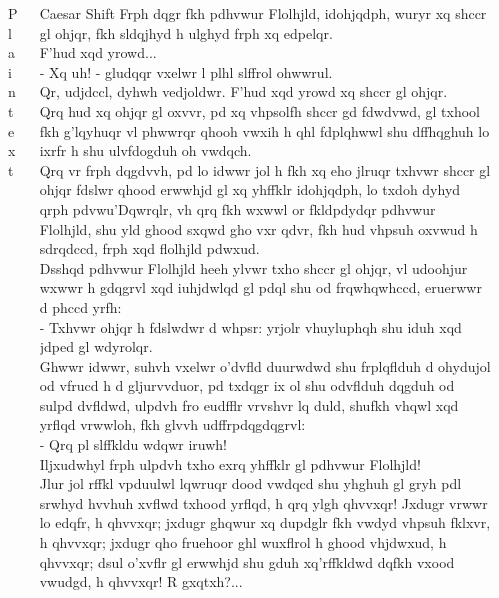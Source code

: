 \documentclass[final,hyperref={pdfpagelabels=false}]{beamer}
\begin{document}
\begin{frame}{}
\begin{columns}[t]
\begin{column}{.2\linewidth}
\begin{block}{Plaintext}
      \end{block}
    \end{column}
    \begin{column}{.2\linewidth}
        \begin{block}{Caesar Shift}
Frph dqgr fkh pdhvwur Flolhjld, idohjqdph, wuryr xq shccr gl ohjqr, fkh sldqjhyd h ulghyd frph xq edpelqr.\\
F'hud xqd yrowd...\\
- Xq uh! - gludqqr vxelwr l plhl slffrol ohwwrul.\\
Qr, udjdccl, dyhwh vedjoldwr. F'hud xqd yrowd xq shccr gl ohjqr.\\
Qrq hud xq ohjqr gl oxvvr, pd xq vhpsolfh shccr gd fdwdvwd, gl txhool fkh g'lqyhuqr vl phwwrqr qhooh vwxih h qhl fdplqhwwl shu dffhqghuh lo ixrfr h shu ulvfdogduh oh vwdqch.\\
Qrq vr frph dqgdvvh, pd lo idwwr jol h fkh xq eho jlruqr txhvwr shccr gl ohjqr fdslwr qhood erwwhjd gl xq yhffklr idohjqdph, lo txdoh dyhyd qrph pdvwu'Dqwrqlr, vh qrq fkh wxwwl or fkldpdydqr pdhvwur Flolhjld, shu yld ghood sxqwd gho vxr qdvr, fkh hud vhpsuh oxvwud h sdrqdccd, frph xqd flolhjld pdwxud.\\
Dsshqd pdhvwur Flolhjld heeh ylvwr txho shccr gl ohjqr, vl udoohjur wxwwr h gdqgrvl xqd iuhjdwlqd gl pdql shu od frqwhqwhccd, eruerwwr d phccd yrfh:\\
- Txhvwr ohjqr h fdslwdwr d whpsr: yrjolr vhuyluphqh shu iduh xqd jdped gl wdyrolqr.\\
Ghwwr idwwr, suhvh vxelwr o'dvfld duurwdwd shu frplqflduh d ohydujol od vfrucd h d gljurvvduor, pd txdqgr ix ol shu odvflduh dqgduh od sulpd dvfldwd, ulpdvh fro eudfflr vrvshvr lq duld, shufkh vhqwl xqd yrflqd vrwwloh, fkh glvvh udffrpdqgdqgrvl:\\
- Qrq pl slffkldu wdqwr iruwh!\\
Iljxudwhyl frph ulpdvh txho exrq yhffklr gl pdhvwur Flolhjld!\\
Jlur jol rffkl vpduulwl lqwruqr dood vwdqcd shu yhghuh gl gryh pdl srwhyd hvvhuh xvflwd txhood yrflqd, h qrq ylgh qhvvxqr! Jxdugr vrwwr lo edqfr, h qhvvxqr; jxdugr ghqwur xq dupdglr fkh vwdyd vhpsuh fklxvr, h qhvvxqr; jxdugr qho fruehoor ghl wuxflrol h ghood vhjdwxud, h qhvvxqr; dsul o'xvflr gl erwwhjd shu gduh xq'rffkldwd dqfkh vxood vwudgd, h qhvvxqr! R gxqtxh?...\\
        \end{block}
    \end{column}
    \begin{column}{.2\linewidth}

\end{column}
\end{columns}
\end{frame}
\end{document}
